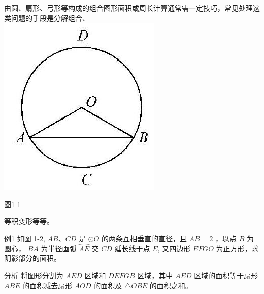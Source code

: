 \documentclass[10pt]{article}
\begin{document}
由圆、扇形、弓形等构成的组合图形面积或周长计算通常需一定技巧，常见处理这类问题的手段是分解组合、\\
\includegraphics[max width=\textwidth, center]{2024_10_30_66b8e5e701da2093c133g-011(2)}

图1-1

等积变形等等。

例1 如图 1-2, $A B 、 C D$ 是 $\odot O$ 的两条互相垂直的直径，且 $A B=2$ ，以点 $B$ 为圆心， $B A$ 为半径画弧 $\overparen{A E}$ 交 $C D$ 延长线于点 $E$, 又四边形 $E F G O$ 为正方形，求阴影部分的面积。

分析 将图形分割为 $A E D$ 区域和 $D E F G B$ 区域，其中 $A E D$ 区域的面积等于扇形 $A B E$ 的面积减去扇形 $A O D$ 的面积及 $\triangle O B E$ 的面积之和。
\end{document}

